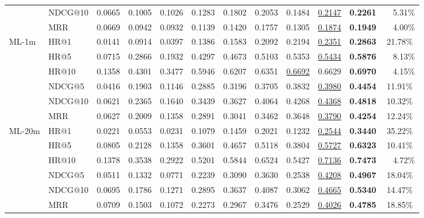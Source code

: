 \begin{table}[]
\begin{adjustbox}{max width=\textwidth}
\begin{tabular}{l l c c c c c c c c c c}
         & NDCG@10 & 0.0665 & 0.1005 & 0.1026 & 0.1283 & 0.1802 & 0.2053 & 0.1484 & \underline{0.2147} & \textbf{0.2261} & ~~5.31\%\\
         & MRR & 0.0669 & 0.0942 & 0.0932 & 0.1139 & 0.1420 & 0.1757 & 0.1305 & \underline{0.1874} & \textbf{0.1949} & ~~4.00\%\\
         \midrule
        \multirow{6}{*}{ML-1m} & HR@1 & 0.0141 & 0.0914 & 0.0397 & 0.1386 & 0.1583 & 0.2092 & 0.2194 & \underline{0.2351} & \textbf{0.2863} & 21.78\%\\
         & HR@5 & 0.0715 & 0.2866 & 0.1932 & 0.4297 & 0.4673 & 0.5103 & 0.5353 & \underline{0.5434} & \textbf{0.5876} & ~~8.13\%\\
         & HR@10 & 0.1358 & 0.4301 & 0.3477 & 0.5946 & 0.6207 & 0.6351 &  \underline{0.6692} & 0.6629 & \textbf{0.6970} & ~~4.15\%\\
         & NDCG@5 & 0.0416 & 0.1903 & 0.1146 & 0.2885 & 0.3196 & 0.3705 & 0.3832 & \underline{0.3980} & \textbf{0.4454} & 11.91\%\\
         & NDCG@10 & 0.0621 & 0.2365 & 0.1640 & 0.3439 & 0.3627 & 	0.4064 & 0.4268 & \underline{0.4368} & \textbf{0.4818} & 10.32\%\\
         & MRR & 0.0627 & 0.2009 & 0.1358 & 0.2891 & 0.3041 & 	0.3462 & 0.3648 & \underline{0.3790} & \textbf{0.4254} & 12.24\%\\
         \midrule
        \multirow{6}{*}{ML-20m} & HR@1 & 0.0221 & 0.0553 & 0.0231 & 0.1079 & 0.1459 & 0.2021 & 0.1232 & \underline{0.2544} & \textbf{0.3440} & 35.22\%\\
         & HR@5 & 0.0805 & 0.2128 & 0.1358 & 0.3601 & 0.4657 & 0.5118 & 0.3804 & \underline{0.5727} & \textbf{0.6323} & 10.41\%\\
         & HR@10 & 0.1378 & 0.3538 & 0.2922 & 0.5201 & 0.5844 & 0.6524 & 0.5427 & \underline{0.7136} & \textbf{0.7473} & ~~4.72\% \\
         & NDCG@5 & 0.0511 & 0.1332 & 0.0771 & 0.2239 & 0.3090 & 0.3630 & 0.2538 & \underline{0.4208} & \textbf{0.4967} & 18.04\%\\
         & NDCG@10 & 0.0695 & 0.1786 & 0.1271 & 0.2895 & 0.3637 & 	0.4087 & 0.3062 & \underline{0.4665} & \textbf{0.5340} & 14.47\% \\
         & MRR & 0.0709 & 0.1503 & 0.1072 & 0.2273 & 0.2967 & 0.3476 & 0.2529 & \underline{0.4026} & \textbf{0.4785} & 18.85\% \\
        \bottomrule
        \end{tabular}
    \end{adjustbox}
    \label{tab:result}
\end{table}


